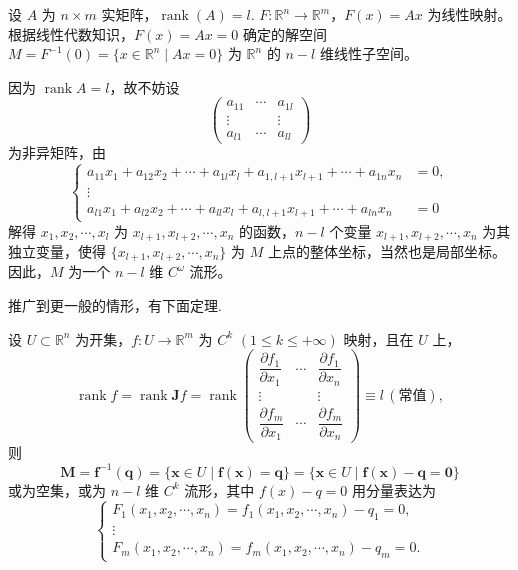 \begin{example}\label{ex:8.4.4}
设 $A$ 为 $n \times m$ 实矩阵，$\operatorname{rank}(A) = l$. $F: \mathbb{R}^{n} \to \mathbb{R}^{m}$，$F(x) = Ax$ 为线性映射。根据线性代数知识，$F(x) = Ax = 0$ 确定的解空间 $M = F^{-1}(0) = \{x \in \mathbb{R}^{n} \mid Ax = 0\}$ 为 $\mathbb{R}^{n}$ 的 $n - l$ 维线性子空间。

因为 $\operatorname{rank} A = l$，故不妨设
\[
  \begin{pmatrix}
    a_{11} & \cdots & a_{1l} \\
    \vdots & & \vdots \\
    a_{l1} & \cdots & a_{ll}
  \end{pmatrix}
\]
为非异矩阵，由
\[
  \left\{\begin{aligned}
    a_{11}x_{1} + a_{12}x_{2} + \cdots + a_{1l}x_{l} + a_{1,l+1}x_{l+1} + \cdots + a_{1n}x_{n} &= 0, \\
    \vdots \\
    a_{l1}x_{1} + a_{l2}x_{2} + \cdots + a_{ll}x_{l} + a_{l,l+1}x_{l+1} + \cdots + a_{ln}x_{n} &= 0
  \end{aligned}\right.
\]
解得 $x_{1},x_{2},\cdots,x_{l}$ 为 $x_{l+1},x_{l+2},\cdots,x_{n}$ 的函数，$n - l$ 个变量 $x_{l+1},x_{l+2},\cdots,x_{n}$ 为其独立变量，使得 $\{x_{l+1},x_{l+2},\cdots,x_{n}\}$ 为 $M$ 上点的整体坐标，当然也是局部坐标。因此，$M$ 为一个 $n-l$ 维 $C^{\omega}$ 流形。
\end{example}

\noindent 推广到更一般的情形，有下面定理.

\begin{theorem}\label{thm:8.4.5}
设 $U \subset \mathbb{R}^{n}$ 为开集，$f: U \to \mathbb{R}^{m}$ 为 $C^{k}$ $(1 \leqslant k \leqslant +\infty)$ 映射，且在 $U$ 上，
\[
  \operatorname{rank} f = \operatorname{rank} \boldsymbol{J}f = \operatorname{rank}\begin{pmatrix}
    \dfrac{\partial f_{1}}{\partial x_{1}} & \cdots & \dfrac{\partial f_{1}}{\partial x_{n}} \\
    \vdots & & \vdots \\
    \dfrac{\partial f_{m}}{\partial x_{1}} & \cdots & \dfrac{\partial f_{m}}{\partial x_{n}}
  \end{pmatrix} \equiv l\,(\text{常值}),
\]
则
\[
  \boldsymbol{M} = \boldsymbol{f}^{-1}(\boldsymbol{q}) = \{\boldsymbol{x} \in U \mid \boldsymbol{f}(\boldsymbol{x}) = \boldsymbol{q}\} = \{\boldsymbol{x} \in U \mid \boldsymbol{f}(\boldsymbol{x}) - \boldsymbol{q} = \boldsymbol{0}\}
\]
或为空集，或为 $n-l$ 维 $C^{k}$ 流形，其中 $f(x) - q = 0$ 用分量表达为
\[
  \left\{\begin{array}{l}
    F_{1}(x_{1},x_{2},\cdots,x_{n}) = f_{1}(x_{1},x_{2},\cdots,x_{n}) - q_{1} = 0, \\
    \vdots \\
    F_{m}(x_{1},x_{2},\cdots,x_{n}) = f_{m}(x_{1},x_{2},\cdots,x_{n}) - q_{m} = 0.
  \end{array}\right.
\]
\end{theorem}

